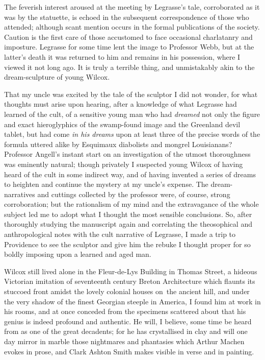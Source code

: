 The feverish interest aroused at the meeting by Legrasse's tale,
corroborated as it was by the statuette, is echoed in the subsequent
correspondence of those who attended; although scant mention occurs in
the formal publications of the society. Caution is the first care of
those accustomed to face occasional charlatanry and imposture. Legrasse
for some time lent the image to Professor Webb, but at the latter's
death it was returned to him and remains in his possession, where I
viewed it not long ago. It is truly a terrible thing, and unmistakably
akin to the dream-sculpture of young Wilcox.

\pagebreak

That my uncle was excited by the tale of the sculptor I did not wonder,
for what thoughts must arise upon hearing, after a knowledge of what
Legrasse had learned of the cult, of a sensitive young man who had
\emph{dreamed} not only the figure and exact hieroglyphics of the swamp-found
image and the Greenland devil tablet, but had come \emph{in his dreams} upon at
least three of the precise words of the formula uttered alike by
Esquimaux diabolists and mongrel Louisianans? Professor Angell's instant
start on an investigation of the utmost thoroughness was eminently
natural; though privately I suspected young Wilcox of having heard of
the cult in some indirect way, and of having invented a series of dreams
to heighten and continue the mystery at my uncle's expense. The
dream-narratives and cuttings collected by the professor were, of
course, strong corroboration; but the rationalism of my mind and the
extravagance of the whole subject led me to adopt what I thought the
most sensible conclusions. So, after thoroughly studying the manuscript
again and correlating the theosophical and anthropological notes with
the cult narrative of Legrasse, I made a trip to Providence to see the
sculptor and give him the rebuke I thought proper for so boldly imposing
upon a learned and aged man.

Wilcox still lived alone in the Fleur-de-Lys Building in Thomas Street,
a hideous Victorian imitation of seventeenth century Breton Architecture
which flaunts its stuccoed front amidst the lovely colonial houses on\est\
the ancient hill, and under the very shadow of the finest Georgian
steeple in America, I found him at work in his rooms, and at once
conceded from the specimens scattered about that his genius is indeed
profound and authentic. He will, I believe, some time be heard from as
one of the great decadents; for he has crystallised in clay and will one
day mirror in marble those nightmares and phantasies which Arthur Machen
evokes in prose, and Clark Ashton Smith makes visible in verse and in
painting.

